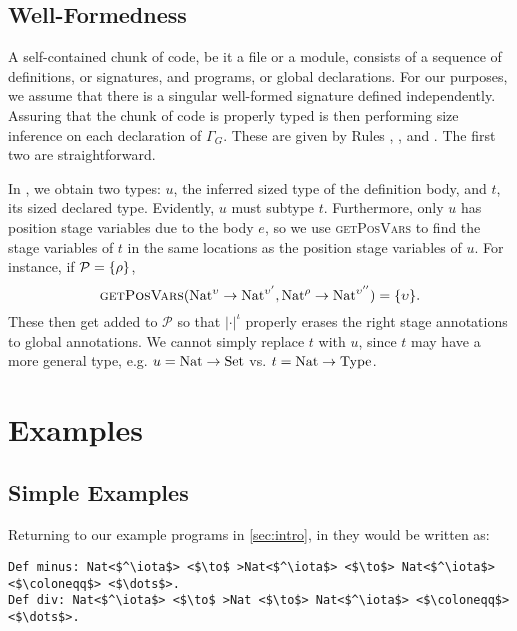 \documentclass[nonacm,screen,10pt]{acmart}
\begin{document}
\subsection{Well-Formedness}

A self-contained chunk of code, be it a file or a module, consists of a sequence of \coinductive definitions, or signatures, and programs, or global declarations. For our purposes, we assume that there is a singular well-formed signature defined independently. Assuring that the chunk of code is properly typed is then performing size inference on each declaration of $\Gamma_G$. These are given by Rules , , and . The first two are straightforward.

In , we obtain two types: $u$, the inferred sized type of the definition body, and $t$, its sized declared type. Evidently, $u$ must subtype $t$. Furthermore, only $u$ has position stage variables due to the body $e$, so we use \textsc{getPosVars} to find the stage variables of $t$ in the same locations as the position stage variables of $u$. For instance, if $\mathcal{P} = \{\rho\}$, $$\textsc{getPosVars}(\text{Nat}^\upsilon \to \text{Nat}^{\upsilon'}, \text{Nat}^\rho \to \text{Nat}^{\upsilon''}) = \{\upsilon\}.$$ These then get added to $\mathcal{P}$ so that $|\cdot|^\iota$ properly erases the right stage annotations to global annotations. We cannot simply replace $t$ with $u$, since $t$ may have a more general type, e.g. $u = \text{Nat} \to \text{Set}$ vs. $t = \text{Nat} \to \text{Type}_{}$.

\section{Examples}\label{sec:examples}

\subsection{Simple Examples}

Returning to our example programs in \autoref{sec:intro}, in \lang they would be written as:

\begin{verbatim}
Def minus: Nat<$^\iota$> <$\to$ >Nat<$^\iota$> <$\to$> Nat<$^\iota$> <$\coloneqq$> <$\dots$>.
Def div: Nat<$^\iota$> <$\to$ >Nat <$\to$> Nat<$^\iota$> <$\coloneqq$> <$\dots$>.
\end{verbatim}
\end{document}
